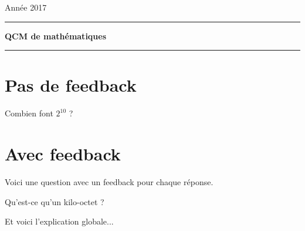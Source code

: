 \documentclass[12pt,a4paper]{article}
\begin{document}
 
 


\hfill\textsf{Ann\'ee 2017}

\vspace*{0.5ex}
\hrule\vspace*{1.5ex} 
\hfil\textsf{\textbf{\Large QCM de mathématiques}}
\vspace*{1ex} \hrule 
\vspace*{5ex} 


\section{Pas de feedback}


\begin{question}

Combien font $2^{10}$ ? 

\begin{answers}  
\end{answers}
\end{question}



\section{Avec feedback}

\begin{question}

Voici une question avec un feedback pour chaque réponse.

Qu'est-ce qu'un kilo-octet ?


\begin{answers}
	

\end{answers}

\begin{explanations}
Et voici l'explication globale...
\end{explanations}

\end{question}



%
\end{document}
